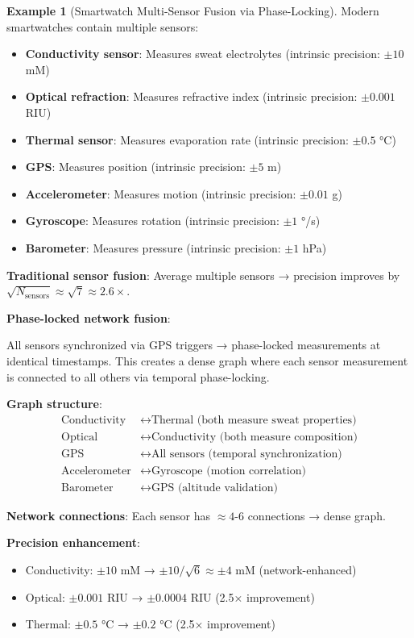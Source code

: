 \documentclass[11pt,a4paper]{article}
\theoremstyle{definition}
\newtheorem{example}[theorem]{Example}
\theoremstyle{remark}
\begin{document}
\begin{example}[Smartwatch Multi-Sensor Fusion via Phase-Locking]
Modern smartwatches contain multiple sensors:
\begin{itemize}
\item \textbf{Conductivity sensor}: Measures sweat electrolytes (intrinsic precision: $\pm 10$ mM)
\item \textbf{Optical refraction}: Measures refractive index (intrinsic precision: $\pm 0.001$ RIU)
\item \textbf{Thermal sensor}: Measures evaporation rate (intrinsic precision: $\pm 0.5$ °C)
\item \textbf{GPS}: Measures position (intrinsic precision: $\pm 5$ m)
\item \textbf{Accelerometer}: Measures motion (intrinsic precision: $\pm 0.01$ g)
\item \textbf{Gyroscope}: Measures rotation (intrinsic precision: $\pm 1$ °/s)
\item \textbf{Barometer}: Measures pressure (intrinsic precision: $\pm 1$ hPa)
\end{itemize}

\textbf{Traditional sensor fusion}: Average multiple sensors → precision improves by $\sqrt{N_{\text{sensors}}} \approx \sqrt{7} \approx 2.6\times$.

\textbf{Phase-locked network fusion}:

All sensors synchronized via GPS triggers → phase-locked measurements at identical timestamps. This creates a dense graph where each sensor measurement is connected to all others via temporal phase-locking.

\textbf{Graph structure}:
\begin{align}
\text{Conductivity} &\leftrightarrow \text{Thermal (both measure sweat properties)} \\
\text{Optical} &\leftrightarrow \text{Conductivity (both measure composition)} \\
\text{GPS} &\leftrightarrow \text{All sensors (temporal synchronization)} \\
\text{Accelerometer} &\leftrightarrow \text{Gyroscope (motion correlation)} \\
\text{Barometer} &\leftrightarrow \text{GPS (altitude validation)}
\end{align}

\textbf{Network connections}: Each sensor has $\approx 4$-6 connections → dense graph.

\textbf{Precision enhancement}:
\begin{itemize}
\item Conductivity: $\pm 10$ mM → $\pm 10/\sqrt{6} \approx \pm 4$ mM (network-enhanced)
\item Optical: $\pm 0.001$ RIU → $\pm 0.0004$ RIU (2.5× improvement)
\item Thermal: $\pm 0.5$ °C → $\pm 0.2$ °C (2.5× improvement)
\end{itemize}


\end{example}
\end{document}
